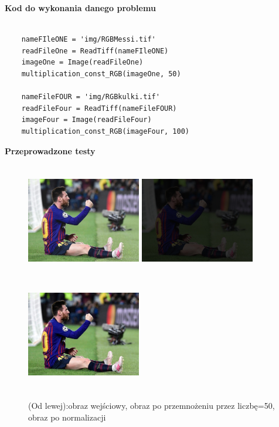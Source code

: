 \documentclass[magisterska,openany]{pracadypl}
\begin{document}
\vspace{0.5cm}
\textbf{\Large Kod do wykonania danego problemu}
\lstset{language=Python}
\vspace{0.25cm}
\begin{lstlisting}

	nameFIleONE = 'img/RGBMessi.tif'
	readFileOne = ReadTiff(nameFIleONE)
	imageOne = Image(readFileOne)
	multiplication_const_RGB(imageOne, 50)
	
	nameFileFOUR = 'img/RGBkulki.tif'
	readFileFour = ReadTiff(nameFileFOUR)
	imageFour = Image(readFileFour)
	multiplication_const_RGB(imageFour, 100)

\end{lstlisting}

\newpage
\vspace{0.25cm}\textbf{\Large Przeprowadzone testy}
\vspace{0.5cm}
\begin{figure}[h]
\centering
\includegraphics[width=5cm, height=5cm]{orgi/RGBMessi.jpg}
\includegraphics[width=5cm, height=5cm]{4_3/multiconstRGB1.jpg}
\includegraphics[width=5cm, height=5cm]{4_3/nmulticonstRGB1.jpg}
\caption{(Od lewej):obraz wejściowy, obraz po przemnożeniu przez liczbę=50,
obraz po normalizacji}
\end{figure}
\end{document}
